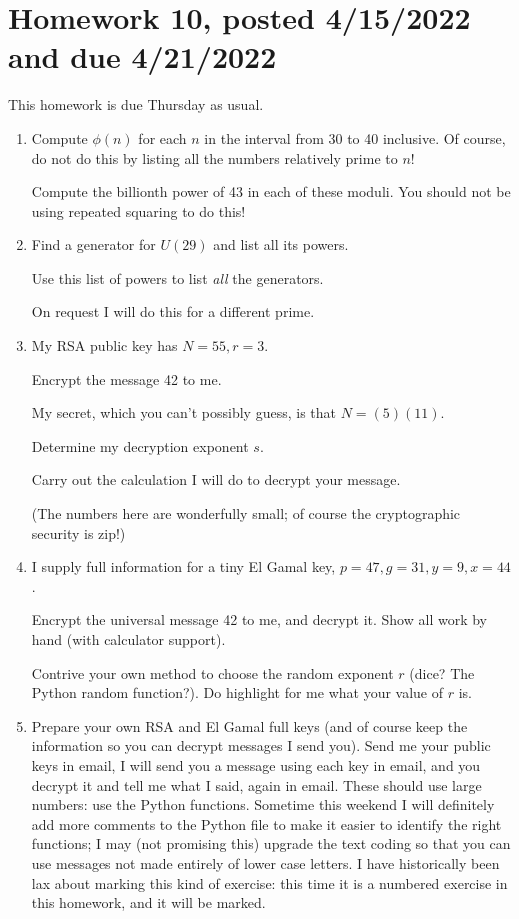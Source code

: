 \documentclass[12pt]{article}
\begin{document}
\section{Homework 10, posted 4/15/2022 and due 4/21/2022}

This homework is due Thursday as usual.

\begin{enumerate}

\item  Compute $\phi(n)$ for each $n$ in the interval from 30 to 40 inclusive.  Of course, do not do this by listing all the numbers relatively prime to $n$!

Compute the billionth power of 43 in each of these moduli.  You should not be using repeated squaring to do this!

\item  Find a generator for $U(29)$ and list all its powers.

Use this list of powers to list {\em all\/} the generators.

On request I will do this for a different prime.

\item My RSA public key has $N=55, r=3$.

Encrypt the message 42 to me.

My secret, which you can't possibly guess, is that $N=(5)(11)$.

Determine my decryption exponent $s$.

Carry out the calculation I will do to decrypt your message.

(The numbers here are wonderfully small;  of course the cryptographic security is zip!)

\item  I supply full information for a tiny El Gamal key, $p=47, g=31, y = 9, x=44$.

Encrypt the universal message 42 to me, and decrypt it.  Show all work by hand (with calculator support).

Contrive your own method to choose the random exponent $r$ (dice?  The Python random function?).  Do highlight for me what your value of $r$ is.

\item Prepare your own RSA and El Gamal full keys (and of course keep the information so you can decrypt messages I send you).
Send me your public keys in email, I will send you a message using each key in email, and you decrypt it and tell me what I said, again in email.  These should use large numbers:  use the Python functions.  Sometime this weekend I will definitely add more comments to the Python file to make it easier to identify the right functions;  I may (not promising this) upgrade the text coding so that you can use messages not made entirely of lower case letters.  I have historically been lax about marking this kind of exercise:  this time it is a numbered exercise in this homework, and it will be marked.

\end{enumerate}
\end{document}

